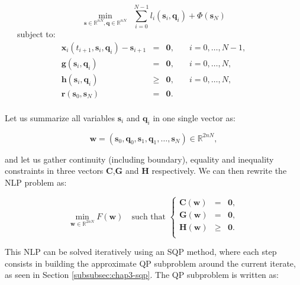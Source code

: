 \begin{equation}
  \min_{\mathbf{s}\in\mathbb R^{nN},\mathbf{q}\in\mathbb R^{nN}}
  \ \ \sum_{i=0}^{N-1}l_i(\mathbf{s}_i,\mathbf{q}_i) +
  \Phi(\mathbf{s}_N)
\end{equation}
\ \ \ subject to:
\begin{equation}
  \begin{array}{rcll}
   \mathbf{x}_i(t_{i+1},\mathbf{s}_i,\mathbf{q}_i) - \mathbf{s}_{i+1} &
    = & \mathbf{0}, & \quad i=0,\ldots,N-1,\\%
    \mathbf{g}(\mathbf{s}_i,\mathbf{q}_i) & = & \mathbf{0}, & \quad i=0,\ldots,N,%
    \\%
    \mathbf{h}(\mathbf{s}_i,\mathbf{q}_i) & \ge & \mathbf{0}, & \quad i=0,\ldots,N,%
    \\%
    \mathbf{r} (\mathbf{s}_0,\mathbf{s}_N) & = & \mathbf{0}.%
    \\%
  \end{array}
\end{equation} 

Let us summarize all variables $\mathbf{s}_i$ and $\mathbf{q}_i$ in
one single vector as:

\begin{equation}
\mathbf{w}=(\mathbf{s}_0,\mathbf{q}_0,\mathbf{s}_1,\mathbf{q}_1,\ldots,\mathbf{s}_N)
\in \mathbb R^{2nN},
\end{equation} 

and let us gather continuity (including boundary), equality and
inequality constraints in three vectors $\mathbf{C}$,$\mathbf{G}$ and
$\mathbf{H}$ respectively. We can then rewrite the NLP problem as:

\begin{equation}
  \min_{\mathbf{w}\in\mathbb R^{2nN}}F(\mathbf{w}) \quad\text{such that }
  \left\{
    \begin{array}{rcl}
      \mathbf{C}(\mathbf{w}) &=& \mathbf{0},\\
      \mathbf{G}(\mathbf{w}) &=& \mathbf{0},\\
      \mathbf{H}(\mathbf{w}) &\ge& \mathbf{0}.\\
    \end{array}
    \right.
\end{equation}

This NLP can be solved iteratively using an SQP method, where each
step consists in building the approximate QP subproblem around the
current iterate, as seen in Section \ref{subsubsec:chap3-sqp}. The QP
subproblem is written as:


